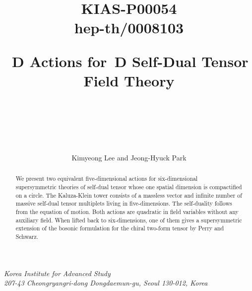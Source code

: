 \documentclass[a4paper,12pt]{article}
\begin{document}
  
\begin{titlepage}
\title{\vskip -60pt
{\small\begin{flushright} 
KIAS-P00054\\
hep-th/0008103 
\end{flushright}}
\vskip 45pt
\coordHE{}\,D Actions for \coordHE{}\,D Self-Dual Tensor Field Theory\\
~\\}
\vspace{4.0cm}
\author{\\
\\
\\Kimyeong Lee and Jeong-Hyuck Park}
\date{}
\maketitle
\vspace{-1.0cm}
\begin{center}
\textit{Korea Institute for Advanced Study}\\
\textit{207-43 Cheongryangri-dong Dongdaemun-gu, Seoul 130-012, Korea}
\end{center}
\vspace{2.0cm}
\begin{abstract}
\noindent We present two  equivalent  five-dimensional actions for six-dimensional  \coordHE{}~\coordHE{} supersymmetric theories of self-dual tensor whose one spatial dimension is compactified on a circle.   The Kaluza-Klein tower consists of a massless vector and infinite number of massive self-dual tensor multiplets living in five-dimensions.  
The self-duality follows from the equation of motion.  
Both  actions are quadratic in field variables without any auxiliary field. When lifted back to six-dimensions, one of them  gives  a  supersymmetric extension of the bosonic formulation for the chiral two-form tensor by Perry and Schwarz. 
\end{abstract}
\thispagestyle{empty}
\end{titlepage}
\newpage
\end{document}
